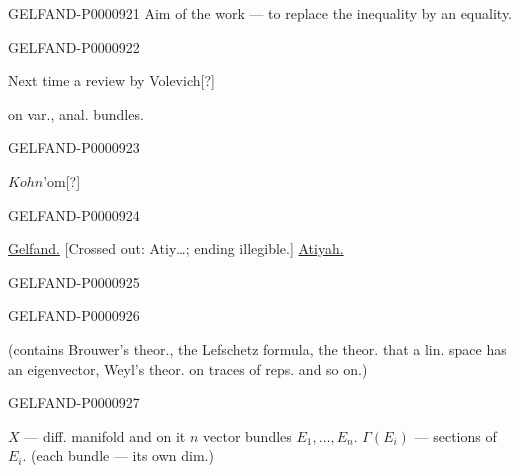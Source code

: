 \begin{GelfandAdjacentEvidence}{GELFAND-P000092}{1}
Aim of the work — to replace the inequality by an equality.
\end{GelfandAdjacentEvidence}
\begin{GelfandAdjacentEvidence}{GELFAND-P000092}{2}

Next time a review by
Volevich[?]

on var., anal. bundles.
\end{GelfandAdjacentEvidence}
\begin{GelfandAdjacentEvidence}{GELFAND-P000092}{3}

$Kohn$'om[?]

\end{GelfandAdjacentEvidence}
\begin{GelfandAdjacentEvidence}{GELFAND-P000092}{4}


\underline{Gelfand.}
[Crossed out: Atiy…; ending illegible.] \underline{Atiyah.}

\end{GelfandAdjacentEvidence}
\begin{GelfandAdjacentEvidence}{GELFAND-P000092}{5}

\end{GelfandAdjacentEvidence}
\begin{GelfandAdjacentEvidence}{GELFAND-P000092}{6}

(contains Brouwer's theor., the Lefschetz formula, the theor. that a lin. space has an eigenvector,
Weyl's theor. on traces of reps. and so on.)
\end{GelfandAdjacentEvidence}
\begin{GelfandAdjacentEvidence}{GELFAND-P000092}{7}

$X$ — diff. manifold and on it $n$ vector bundles $E_1,\ldots,E_n$.
$\Gamma(E_i)$ — sections of $E_i$. (each bundle — its own dim.)
\end{GelfandAdjacentEvidence}

